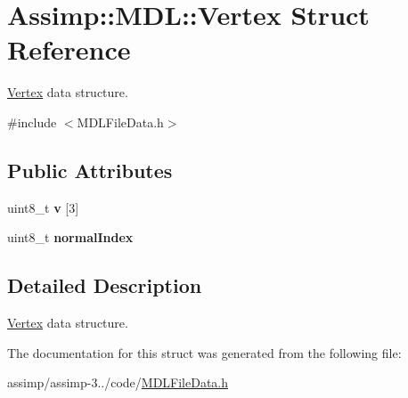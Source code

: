 \hypertarget{struct_assimp_1_1_m_d_l_1_1_vertex}{\section{Assimp\+:\+:M\+D\+L\+:\+:Vertex Struct Reference}
\label{struct_assimp_1_1_m_d_l_1_1_vertex}
}


\hyperlink{struct_assimp_1_1_m_d_l_1_1_vertex}{Vertex} data structure.  




{\ttfamily \#include $<$M\+D\+L\+File\+Data.\+h$>$}

\subsection*{Public Attributes}
\begin{DoxyCompactItemize}
\item 
\hypertarget{struct_assimp_1_1_m_d_l_1_1_vertex_a1fab1b292934bce18e055c14f8dea06e}{uint8\+\_\+t {\bfseries v} \mbox{[}3\mbox{]}}\label{struct_assimp_1_1_m_d_l_1_1_vertex_a1fab1b292934bce18e055c14f8dea06e}

\item 
\hypertarget{struct_assimp_1_1_m_d_l_1_1_vertex_af7b1c67739fd71550f7b412ac5291605}{uint8\+\_\+t {\bfseries normal\+Index}}\label{struct_assimp_1_1_m_d_l_1_1_vertex_af7b1c67739fd71550f7b412ac5291605}

\end{DoxyCompactItemize}


\subsection{Detailed Description}
\hyperlink{struct_assimp_1_1_m_d_l_1_1_vertex}{Vertex} data structure. 

The documentation for this struct was generated from the following file\+:\begin{DoxyCompactItemize}
\item 
assimp/assimp-\/3../code/\hyperlink{_m_d_l_file_data_8h}{M\+D\+L\+File\+Data.\+h}\end{DoxyCompactItemize}
